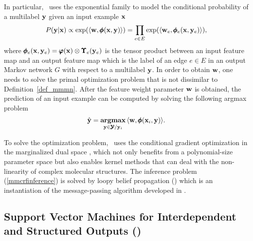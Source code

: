 {In particular, \mmcrf\ uses the exponential family to model the conditional probability of a multilabel $\mathbf {y}$ given an input example $\mathbf {x}$
\begin{align*}
	P(\mathbf {y}|\mathbf {x}) \propto \exp(\langle \mathbf {w}, \pmb \phi(\mathbf {x},\mathbf {y}) \rangle) = \prod_{e\in E}\exp(\langle \mathbf {w}_e, \pmb \phi_e(\mathbf {x},\mathbf {y}_e) \rangle),
\end{align*}
where $\pmb \phi_e(\mathbf {x},\mathbf {y}_e)=\pmb \varphi(\mathbf {x})\otimes\pmb \Upsilon_e(\mathbf {y}_e)$ is the tensor product between an input feature map and an output feature map which is the label of an edge $e\in E$ in an output Markov network $G$ with respect to a multilabel $\mathbf {y}$. 
In order to obtain $\mathbf {w}$, one needs to solve the primal optimization problem that is not dissimilar to Definition~\ref{def_mmmn}.
After the feature weight parameter $\mathbf {w}$ is obtained, the prediction of an input example can be computed by solving the following argmax problem
\begin{align}
	\hat{\mathbf {y}} = \underset{\mathbf {y}\in\pmb {\mathcal{Y}}/\mathbf {y}_i}{\textbf{argmax}} \, \langle \mathbf {w}, \pmb \phi(\mathbf {x}_i,\mathbf {y}) \rangle.\label{mmcrfinference}
\end{align}

To solve the optimization problem, \mmcrf\ uses the conditional gradient optimization \citep{Bertsekas95nonlinear} in the marginalized dual space \citep{Taskar04max}, which not only benefits from a polynomial-size parameter space but also enables kernel methods that can deal with the non-linearity of complex molecular structures.
The inference problem (\ref{mmcrfinference}) is solved by loopy belief propagation (\lbp) which is an instantiation of the message-passing algorithm developed in \citep{Wainwright08graphical}.



%
% 
\subsection{Support Vector Machines for Interdependent and Structured Outputs (\svmstruct)} \label{sc_svmstruct}

}
